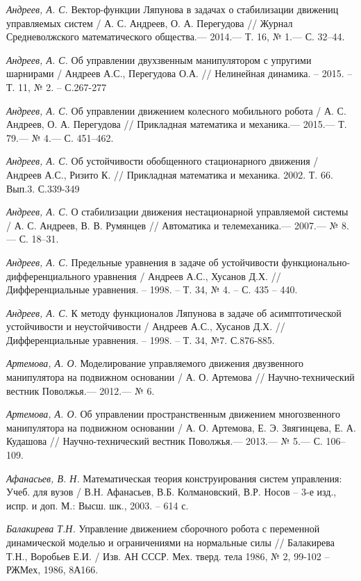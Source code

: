 \begin{thebibliography}{10}
	{\it Андреев, А. С.} Вектор-функции Ляпунова в задачах о стабилизации движениц управляемых систем /
	А. С. Андреев, О. А. Перегудова // Журнал Средневолжского математического общества.— 2014.— Т. 16, № 1.—
	С. 32–44.

	{\it Андреев, А. С.} Об управлении двухзвенным манипулятором с упругими шарнирами / Андреев А.С., Перегудова О.А. // Нелинейная динамика. – 		2015. – Т. 11, № 2. – С.267-277

	{\it Андреев, А. С.} Об управлении движением колесного мобильного робота /
	А. С. Андреев, О. А. Перегудова // Прикладная математика и механика.— 2015.— Т. 79.— № 4.— С. 451–462.

	{\it Андреев, А. С.} Об устойчивости обобщенного стационарного движения / Андреев А.С., Ризито К. // Прикладная математика и механика. 2002. Т.		66. Вып.3. С.339-349 

	{\it Андреев, А. С.} О стабилизации движения нестационарной управляемой системы /
	А. С. Андреев, В. В. Румянцев // Автоматика и телемеханика.— 2007.— № 8.—
	С. 18–31.
	
	{\it Андреев, А. С.} Предельные уравнения в задаче об устойчивости функционально-дифференциального уравнения / Андреев А.С., Хусанов Д.Х. // 		Дифференциальные уравнения. – 1998. – Т. 34, № 4. – С. 435 – 440.
	
	{\it Андреев, А. С.} К методу функционалов Ляпунова в задаче об
	асимптотической устойчивости и неустойчивости / Андреев А.С., Хусанов Д.Х. // Дифференциальные уравнения. – 1998. – Т. 34, №7. С.876-885.
	
	{\it Артемова, А. О.} Моделирование управляемого движения двузвенного манипулятора на подвижном основании /
	А. О. Артемова // Научно-технический вестник Поволжья.— 2012.— № 6.
	
	{\it Артемова, А. О.} Об управлении пространственным движением многозвенного манипулятора на подвижном основании /
	А. О. Артемова, Е. Э. Звягинцева, Е. А. Кудашова // Научно-технический вестник Поволжья.— 2013.— № 5.— С. 106–109.
	
	{\it Афанасьев, В. Н.} Математическая теория конструирования систем управления: Учеб. для вузов / В.Н. Афанасьев, В.Б. Колмановский, В.Р. Носов 	– 3-е изд., испр. и доп. М.: Высш. шк., 2003. – 614 с.

	{\it Балакирева Т.Н.} Управление движением сборочного робота с переменной динамической моделью и ограничениями на нормальные силы // Балакирева 	Т.Н., Воробьев Е.И. / Изв. АН СССР. Мех. тверд. тела 1986, № 2, 99-102 – РЖМех, 1986, 8А166.


\end{thebibliography}
